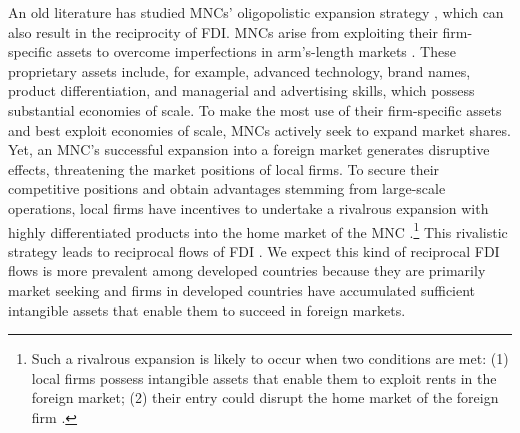 \documentclass[reqno,onecolumn,letterpaper,12pt]{article}
\begin{document}
An old literature has studied MNCs' oligopolistic expansion strategy \citep{Hymer:1976,Kindleberger:1969}, which can also result in the reciprocity of FDI. MNCs arise from exploiting their firm-specific assets to overcome imperfections in arm's-length markets \citep{Caves:1996,Dunning:1992}. These proprietary assets include, for example, advanced technology, brand names, product differentiation, and managerial and advertising skills, which possess substantial economies of scale. To make the most use of their firm-specific assets and best exploit economies of scale, MNCs actively seek to expand market shares. %
Yet, an MNC's successful expansion into a foreign market %
generates disruptive effects, threatening the market positions of local firms. To secure their competitive positions and obtain advantages stemming from large-scale operations, local firms have incentives to undertake a rivalrous expansion with highly differentiated products into the home market of the MNC \citep{Veugelers:1995}.\footnote{Such a rivalrous expansion is likely to occur when two conditions are met: (1) local firms possess intangible assets that enable them to exploit rents in the foreign market; (2) their entry could disrupt the home market of the foreign firm \citep{Graham:1978}.} This rivalistic strategy leads to reciprocal flows of FDI \citep{Graham:1978}. We expect this kind of reciprocal FDI flows is more prevalent among developed countries because they are primarily market seeking and firms in developed countries have accumulated sufficient intangible assets that enable them to succeed in foreign markets.
\end{document}
